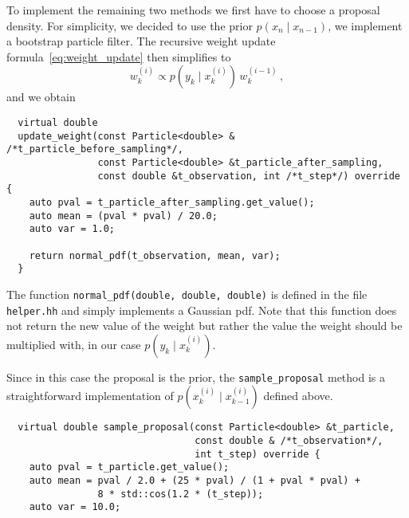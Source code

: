 \begin{example}
  To implement the remaining two methods we first have to choose a
  proposal density. For simplicity, we decided to use the prior
  $p(x_n \mid x_{n-1})$, \ie we implement a bootstrap particle filter.
  The recursive weight update formula~\eqref{eq:weight_update} then
  simplifies to
  \[
    w_k^{(i)} \propto p(y_k \mid x_k^{(i)})\, w^{(i-1)}_k \,,
  \]
  and we obtain
\begin{verbatim}
  virtual double
  update_weight(const Particle<double> & /*t_particle_before_sampling*/,
                const Particle<double> &t_particle_after_sampling,
                const double &t_observation, int /*t_step*/) override {
    auto pval = t_particle_after_sampling.get_value();
    auto mean = (pval * pval) / 20.0;
    auto var = 1.0;

    return normal_pdf(t_observation, mean, var);
  }
\end{verbatim}
  The function \texttt{normal\_pdf(double, double, double)} is defined
  in the file \texttt{helper.hh} and simply implements a Gaussian pdf.
  Note that this function does not return the new value of the weight
  but rather the value the weight should be multiplied with, \ie in
  our case $p(y_k \mid x_k^{(i)})$.

  Since in this case the proposal is the prior, the
  \texttt{sample\_proposal} method is a straightforward implementation
  of $p(x_k^{(i)} \mid x_{k-1}^{(i)})$ defined above.
\begin{verbatim}
  virtual double sample_proposal(const Particle<double> &t_particle,
                                 const double & /*t_observation*/,
                                 int t_step) override {
    auto pval = t_particle.get_value();
    auto mean = pval / 2.0 + (25 * pval) / (1 + pval * pval) +
                8 * std::cos(1.2 * (t_step));
    auto var = 10.0;


\end{verbatim}
\end{example}
